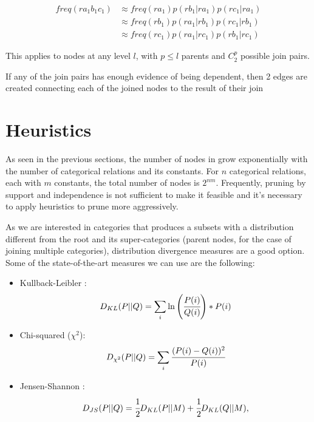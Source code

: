 \begin{equation}
\begin{split} 
  freq(r a_1 b_1 c_1) &\approx freq(r a_1)p (r b_1|r a_1) p(r c_1|r a_1) \\ 
  &\approx  freq(r b_1) p(r a_1|r b_1) p(r c_1|r b_1) \\ 
  &\approx  freq(r c_1) p(r a_1|r c_1) p(r b_1|r c_1)  
\end{split}
\end{equation}

This applies to nodes at any level $l$, with $p \leq l$ parents and $C_{2}^{p}$ possible join pairs.

If any of the join pairs has enough evidence of being dependent, then 2 edges are created connecting each of the joined nodes to the result of their join

\section{Heuristics}

As seen in the previous sections, the number of nodes in \graphname grow exponentially with the number of categorical relations and its constants. For $n$ categorical relations, each with $m$ constants, the total number of nodes is $2^{nm}$. Frequently, pruning by support and independence is not sufficient to make it feasible and it's necessary to apply heuristics to prune more aggressively.

As we are interested in categories that produces a subsets with a distribution different from the root and its super-categories (parent nodes, for the case of joining multiple categories), distribution divergence measures are a good option. Some of the state-of-the-art measures we can use are the following:

\begin{itemize}
 \item Kullback-Leibler \cite{Kullback51klDivergence}: 
    \begin{equation}
      D_{KL}(P||Q)=\sum_{\substack{i}}\ln\left(\cfrac{P(i)}{Q(i)}\right)*P(i)
    \end{equation}
 \item Chi-squared ($\chi^2$):
    \begin{equation}
      D_{\chi^2}(P||Q)=\sum_{\substack{i}}\cfrac{(P(i)-Q(i))^2}{P(i)}
    \end{equation}
 \item Jensen-Shannon \cite{17795}:
    \begin{equation}
      D_{JS}(P||Q)=\cfrac{1}{2}D_{KL}(P||M)+\cfrac{1}{2}D_{KL}(Q||M), 
    \end{equation}
\end{itemize}

